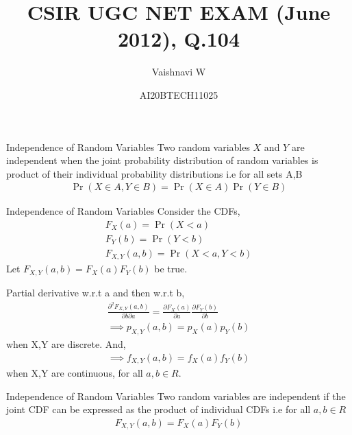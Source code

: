 \documentclass{beamer}
\title{CSIR UGC NET EXAM (June 2012), Q.104}
\author{Vaishnavi W}
\date{AI20BTECH11025}
\providecommand{\pr}[1]{\ensuremath{\Pr\left(#1\right)}}
\providecommand{\brak}[1]{\ensuremath{\left(#1\right)}}
\begin{document}
\begin{frame}
\titlepage
\end{frame}

\begin{frame}
\begin{block}{Independence of Random Variables}
    Two random variables $X$ and $Y$ are independent when the joint probability distribution of random variables is product of their individual probability distributions i.e for all sets A,B
    \begin{align}
        \label{eq1} \pr{X\in A,Y \in B}=\pr{X \in A}\pr{Y \in B}
    \end{align}
\end{block}
    
\end{frame}
\begin{frame}{Independence of Random Variables}
    Consider the CDFs,
    \begin{align}
        F_X\brak{a}=\pr{X<a}\\
        F_Y\brak{b}=\pr{Y<b}\\
        F_{X,Y}\brak{a,b}=\pr{X<a,Y<b}
    \end{align}
    Let $F_{X,Y}\brak{a,b}=F_X\brak{a}F_Y\brak{b}$ be true. 
    
    Partial derivative w.r.t a and then w.r.t b,
    \begin{align}
        \frac{\partial^2 F_{X,Y}\brak{a,b}}{\partial b \partial a}=\frac{\partial F_X\brak{a} }{\partial a}\frac{\partial F_Y\brak{b} }{\partial b} \\
        \implies p_{X,Y}\brak{a,b}=p_X\brak{a}p_Y\brak{b}
    \end{align}
    when X,Y are discrete. And,
    \begin{align}
        \implies f_{X,Y}\brak{a,b}=f_X\brak{a}f_Y\brak{b}
    \end{align}
    when X,Y are continuous, for all $a,b\in R$. 
\end{frame}
\begin{frame}
\begin{block}{Independence of Random Variables}
    Two random variables are independent if the joint CDF can be expressed as the product of individual CDFs i.e for all $a,b\in R$
    \begin{align}
       \label{eq1} F_{X,Y}\brak{a,b}=F_X\brak{a}F_Y\brak{b}
    \end{align}
\end{block}
\end{frame}
\end{document}
